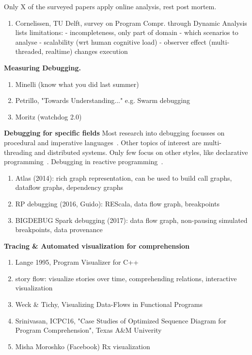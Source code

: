 Only X of the surveyed papers apply online analysis, rest post mortem.

{\color{red}
\begin{enumerate}
 \item Cornelissen, TU Delft, survey on Program Compr. through Dynamic Analysis
 		lists limitations: 
		   - incompleteness, only part of domain
			 - which scenarios to analyse
			 - scalability (wrt human cognitive load) 
		 	 - observer effect (multi-threaded, realtime) changes execution
\end{enumerate}
}

\textbf{Measuring Debugging.}
{\color{red}
\begin{enumerate}
	\item Minelli (know what you did last summer)
	\item Petrillo, "Towards Understanding..." e.g. Swarm debugging
  \item Moritz (watchdog 2.0)
\end{enumerate}
}

\textbf{Debugging for specific fields}
Most research into debugging focusses on procedural and 
imperative languages~\cite{cornelissen2009systematic}.
Other topics of interest are multi-threading and distributed systems.
Only few focus on other styles, like 
declarative programming~\cite{nilsson1998declarative}.
Debugging in reactive programming~\cite{
	salvaneschi2014empirical,salvaneschi2016debugging}.
	
{\color{red}
\begin{enumerate}
	\item Atlas (2014): rich graph representation, can be used to build call graphs, dataflow graphs, dependency graphs
	\item RP debugging (2016, Guido): REScala, data flow graph, breakpoints
	\item BIGDEBUG Spark debugging (2017): data flow graph, non-pausing simulated breakpoints, data provenance
\end{enumerate}
}

\textbf{Tracing \& Automated visualization for comprehension}
\begin{enumerate}\color{red}
 \item Lange 1995, Program Visualizer for C++
 \item story flow: visualize stories over time, comprehending relations, interactive visualization
 \item Weck \& Tichy, Visualizing Data-Flows in Functional Programs
 \item Srinivasan, ICPC16, "Case Studies of Optimized Sequence Diagram for Program Comprehension", Texas A\&M Univerity
 \item Misha Moroshko (Facebook) Rx visualization
\end{enumerate}
